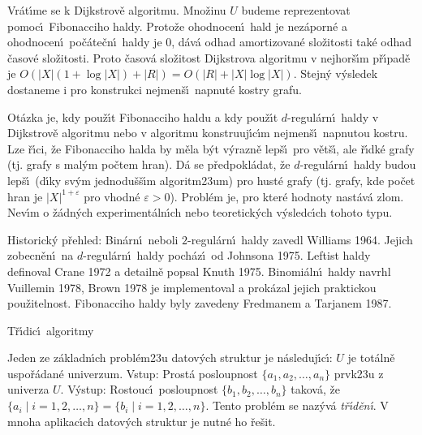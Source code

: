 Vr\'at\'\i me se k Dijkstrov\v e algoritmu. 
Mno\v zinu $U$ bude\-me reprezentovat pomoc\'\i\ Fibonacciho 
haldy. Proto\v ze ohodnocen\'\i\ hald je nez\'aporn\'e a ohodnocen\'\i\ 
po\v c\'ate\v cn\'\i\ haldy je $0$, d\'av\'a odhad amortizovan\'e slo\v zitosti  
tak\'e odhad \v casov\'e slo\v zitos\-ti. Proto \v casov\'a slo\v zitost Dijkstrova 
algoritmu v nejhor\v s\'\i m p\v r\'\i pad\v e je  
$O(|X|(1+\log|X|)+|R|)=O(|R|+|X|\log|X|)$. Stejn\'y v\'ysledek 
dostane\-me i pro konstrukci nejmen\v s\'\i\ napnut\'e kostry 
grafu. 
\medskip

\flushpar Ot\'azka je, kdy pou\v z\'\i t Fibonacciho haldu a kdy 
pou\v z\'\i t $d$-regu\-l\'ar\-n\'\i\ haldy v Dijkstrov\v e algoritmu nebo v 
algoritmu konstruuj\'\i\-c\'\i m nejmen\v s\'\i\ napnutou kostru. Lze 
\v r\'\i ci, \v ze Fibonacciho halda by m\v ela b\'yt v\'yrazn\v e lep\v s\'\i\ pro 
v\v et\v s\'\i , ale \v r\'\i dk\'e grafy (tj. grafy s mal\'ym po\v ctem hran). 
D\'a se p\v redpokl\'adat, \v ze $d$-regul\'arn\'\i\ haldy budou lep\v s\'\i\ 
(d\'\i ky sv\'ym jednodu\v s\v s\'\i m algoritm\accent23um) pro hust\'e 
grafy (tj. grafy, kde po\v cet hran je $|X|^{1+\varepsilon}$ pro vhodn\'e 
$\varepsilon >0$). Probl\'em je, pro kter\'e hodnoty nast\'av\'a zlom. 
Nev\'\i m o \v z\'adn\'ych experiment\'aln\'\i ch nebo teoretick\'ych 
v\'ysledc\'\i ch tohoto typu.
\medskip

\flushpar Historick\'y p\v rehled: Bin\'arn\'\i\ neboli $2$-regul\'arn\'\i\ 
haldy zavedl Williams 1964. Jejich zobecn\v e\-n\'\i\ na $d$-regul\'arn\'\i\ 
haldy poch\'az\'\i\ od Johnsona 1975. Leftist haldy definoval Crane 1972 
a detailn\v e popsal Knuth 1975. Binomi\'aln\'\i\ haldy navrhl Vuillemin 1978, 
Brown 1978 je implementoval a prok\'azal jejich praktickou pou\v zitelnost. 
Fibonacciho haldy byly zavedeny Fredmanem a Tarjanem 1987.
  
\heading
T\v r\'\i dic\'\i\ algoritmy
\endheading

\flushpar Jeden ze z\'akladn\'\i ch probl\'em\accent23u datov\'ych 
struktur je n\'asleduj\'\i c\'\i :\newline 
$U$ je tot\'aln\v e uspo\v r\'adan\'e univerzum.\newline 
Vstup: Prost\'a posloupnost $\{a_1,a_2,\dots,a_n\}$ prvk\accent23u z 
univerza $U$.\newline 
V\'ystup: Rostouc\'\i\ posloupnost $\{b_1,b_2,\dots,b_n\}$ takov\'a, \v ze 
$\{a_i\mid i=1,2,\dots,n\}=\{b_i\mid i=1,2,\dots,n\}$.
Tento probl\'em se naz\'yv\'a \emph{t\v r\'\i d\v en\'\i}. V mnoha 
aplikac\'\i ch datov\'ych struktur je nutn\'e ho \v re\v sit. 
\medskip

